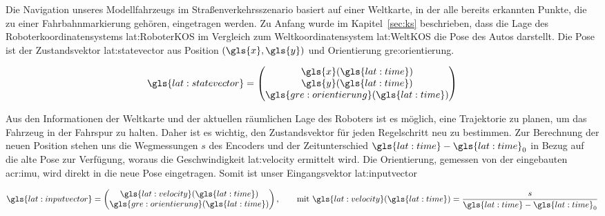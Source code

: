 
Die Navigation unseres Modellfahrzeugs im Straßenverkehrsszenario basiert auf einer Weltkarte, in der alle bereits erkannten Punkte, die zu einer Fahrbahnmarkierung gehören, eingetragen werden. Zu Anfang wurde im Kapitel~\ref{sec:ks} beschrieben, dass die Lage des Roboterkoordinatensystems \gls{lat:RoboterKOS} im Vergleich zum Weltkoordinatensystem \gls{lat:WeltKOS} die Pose des Autos darstellt. Die Pose ist der Zustandsvektor \gls{lat:statevector} aus Position \( (\gls{x},\gls{y}) \) und Orientierung \gls{gre:orientierung}.

\begin{equation}
\gls{lat:statevector} = 
\begin{pmatrix}
\gls{x}(\gls{lat:time}) 	\\
\gls{y}(\gls{lat:time})	\\
\gls{gre:orientierung}(\gls{lat:time})    	\\
\end{pmatrix}
\label{eq:regelung_prinzip_pose}
\end{equation} 

 Aus den Informationen der Weltkarte und der aktuellen räumlichen Lage des Roboters ist es möglich, eine Trajektorie zu planen, um das Fahrzeug in der Fahrspur zu halten. Daher ist es wichtig, den Zustandsvektor für jeden Regelschritt neu zu bestimmen. Zur Berechnung der neuen Position stehen uns die Wegmessungen \(s\) des Encoders und der Zeitunterschied \(\gls{lat:time}-{\gls{lat:time}}_0\) in Bezug auf die alte Pose zur Verfügung, woraus die Geschwindigkeit \gls{lat:velocity} ermittelt wird. Die Orientierung, gemessen von der eingebauten \gls{acr:imu}, wird direkt in die neue Pose eingetragen. Somit ist unser Eingangsvektor \gls{lat:inputvector}
 
\begin{equation}
\gls{lat:inputvector} = 
\begin{pmatrix}
\gls{lat:velocity}(\gls{lat:time}) 			\\
\gls{gre:orientierung}(\gls{lat:time})    	\\
\end{pmatrix}
, \qquad \text{mit }
\gls{lat:velocity}(\gls{lat:time}) = \frac{s}{\gls{lat:time}-{\gls{lat:time}}_0}
\end{equation} 
 
